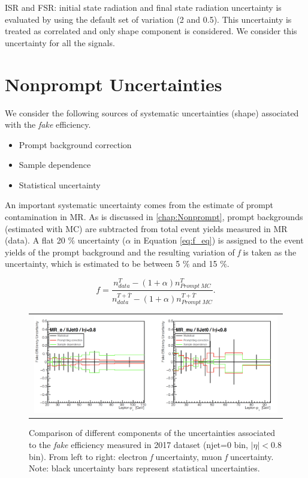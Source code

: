 ISR and FSR: initial state radiation and final state radiation uncertainty is evaluated by using the default set of variation (2 and 0.5). This uncertainty is treated as correlated and only shape component is considered. We consider this uncertainty for all the signals.

\section{Nonprompt Uncertainties}
\label{sec:NonUnc}

We consider the following sources of systematic uncertainties (shape) associated with the \emph{fake} efficiency.

\begin{itemize}
\item Prompt background correction
\item Sample dependence 
\item Statistical uncertainty 
\end{itemize}

An important systematic uncertainty comes from the estimate of prompt contamination in MR. As is discussed in \autoref{chap:Nonprompt}, prompt backgrounds (estimated with MC) are subtracted from total event yields measured in MR (data). A flat 20 $\%$ uncertainty ($\alpha$ in Equation \ref{eq:f_eq}) is assigned to the event yields of the prompt background and the resulting variation of \emph{f} is taken as the uncertainty, which is estimated to be between 5 $\%$ and 15 $\%$.

\begin{equation}
f=\frac{n_{data}^{T}-(1+\alpha)n_{Prompt~MC}^{T}}{n_{data}^{T+\overline{T}}-(1+\alpha)n_{Prompt~MC}^{T+\overline{T}}}.
\label{eq:f_eq}
\end{equation}  

\begin{figure}[tbh!]
 \begin{center}
 \begin{tabular}{c}
 \includegraphics[width=0.99\textwidth]{figures/Part3/Systematics/MR1}
 \end{tabular}
 \caption{Comparison of different components of the uncertainties associated to the \emph{fake} efficiency measured in 2017 dataset (njet=0 bin, $|\eta|<$0.8 bin). From left to right: electron \emph{f} uncertainty, muon \emph{f} uncertainty. Note: black uncertainty bars represent statistical uncertainties.}
 \label{fig:f_comp1}
 \end{center}
\end{figure}

